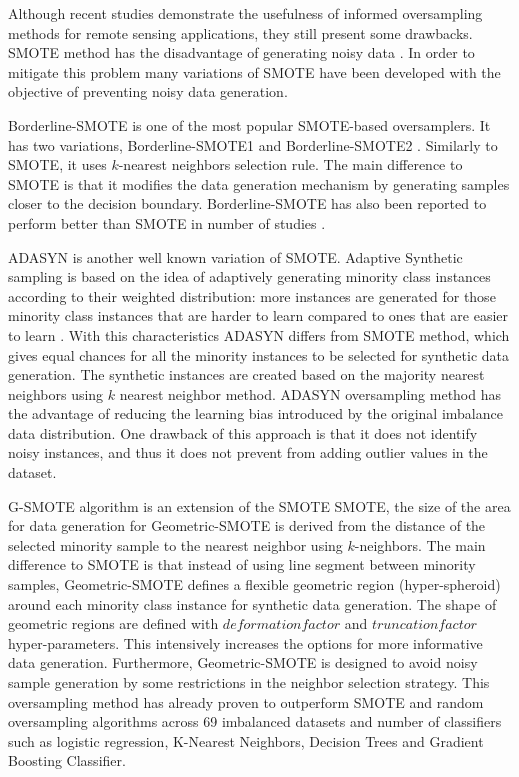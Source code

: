 \documentclass[parskip=full]{scrartcl}
\begin{document}
Although recent studies demonstrate the usefulness of informed oversampling
methods for remote sensing applications, they still present some drawbacks.
SMOTE method has the disadvantage of generating noisy data \cite{He2008}. In
order to mitigate this problem many variations of SMOTE have been developed with
the objective of preventing noisy data generation. 

Borderline-SMOTE is one of the most popular SMOTE-based oversamplers. It has two
variations, Borderline-SMOTE1 and Borderline-SMOTE2 \cite{Han2005}. Similarly to
SMOTE, it uses $k$-nearest neighbors selection rule. The main difference to
SMOTE is that it modifies the data generation mechanism by generating samples
closer to the decision boundary. Borderline-SMOTE has also been reported to
perform better than SMOTE in number of studies \cite{Nguyen2009, Ramentol2012}.

ADASYN is another well known variation of SMOTE. Adaptive Synthetic sampling is
based on the idea of adaptively generating minority class instances according to
their weighted distribution: more instances are generated for those minority
class instances that are harder to learn compared to ones that are easier to
learn \cite{HaiboHe2008}. With this characteristics ADASYN differs from SMOTE
method, which gives equal chances for all the minority instances to be selected
for synthetic data generation. The synthetic instances are created based on the
majority nearest neighbors using $k$ nearest neighbor method. ADASYN
oversampling method has the advantage of reducing the learning bias introduced
by the original imbalance data distribution. One drawback of this approach is
that it does not identify noisy instances, and thus it does not prevent from
adding outlier values in the dataset.

G-SMOTE algorithm is an extension of the SMOTE SMOTE, the size of the area for
data generation for Geometric-SMOTE is derived from the distance of the selected
minority sample to the nearest neighbor using $k$-neighbors. The main difference
to SMOTE is that instead of using line segment between minority samples,
Geometric-SMOTE defines a flexible geometric region (hyper-spheroid) around each
minority class instance for synthetic data generation. The shape of geometric
regions are defined with $deformation factor$ and $truncation factor$
hyper-parameters. This intensively increases the options for more informative
data generation. Furthermore, Geometric-SMOTE is designed to avoid noisy sample
generation by some restrictions in the neighbor selection strategy. This
oversampling method has already proven to outperform SMOTE and random
oversampling algorithms across 69 imbalanced datasets and number of classifiers
such as logistic regression, K-Nearest Neighbors, Decision Trees and Gradient
Boosting Classifier.
\end{document}
